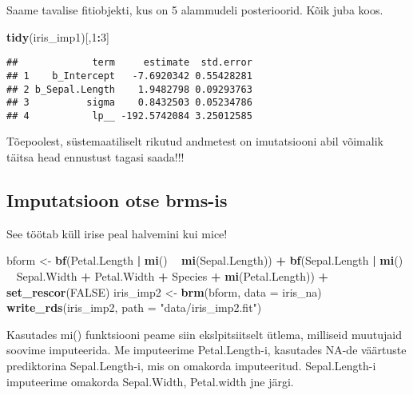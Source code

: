 \documentclass[]{article}
\newenvironment{Shaded}{\begin{snugshade}}{\end{snugshade}}
\newcommand{\KeywordTok}[1]{\textcolor[rgb]{0.13,0.29,0.53}{\textbf{#1}}}
\newcommand{\DataTypeTok}[1]{\textcolor[rgb]{0.13,0.29,0.53}{#1}}
\newcommand{\DecValTok}[1]{\textcolor[rgb]{0.00,0.00,0.81}{#1}}
\newcommand{\StringTok}[1]{\textcolor[rgb]{0.31,0.60,0.02}{#1}}
\newcommand{\OtherTok}[1]{\textcolor[rgb]{0.56,0.35,0.01}{#1}}
\newcommand{\OperatorTok}[1]{\textcolor[rgb]{0.81,0.36,0.00}{\textbf{#1}}}
\newcommand{\NormalTok}[1]{#1}
\begin{document}
Saame tavalise fitiobjekti, kus on 5 alammudeli posterioorid. Kõik juba
koos.

\begin{Shaded}
\begin{Highlighting}[]
\KeywordTok{tidy}\NormalTok{(iris_imp1)[,}\DecValTok{1}\OperatorTok{:}\DecValTok{3}\NormalTok{]}
\end{Highlighting}
\end{Shaded}

\begin{verbatim}
##             term     estimate  std.error
## 1    b_Intercept   -7.6920342 0.55428281
## 2 b_Sepal.Length    1.9482798 0.09293763
## 3          sigma    0.8432503 0.05234786
## 4           lp__ -192.5742084 3.25012585
\end{verbatim}

Tõepoolest, süstemaatiliselt rikutud andmetest on imutatsiooni abil
võimalik täitsa head ennustust tagasi saada!!!

\subsection{Imputatsioon otse brms-is}\label{imputatsioon-otse-brms-is}

See töötab küll irise peal halvemini kui mice!

\begin{Shaded}
\begin{Highlighting}[]
\NormalTok{bform <-}\StringTok{ }\KeywordTok{bf}\NormalTok{(Petal.Length }\OperatorTok{|}\StringTok{ }\KeywordTok{mi}\NormalTok{() }\OperatorTok{~}\StringTok{ }\KeywordTok{mi}\NormalTok{(Sepal.Length)) }\OperatorTok{+}\StringTok{ }
\StringTok{  }\KeywordTok{bf}\NormalTok{(Sepal.Length }\OperatorTok{|}\StringTok{ }\KeywordTok{mi}\NormalTok{() }\OperatorTok{~}\StringTok{ }\NormalTok{Sepal.Width }\OperatorTok{+}\StringTok{ }\NormalTok{Petal.Width }\OperatorTok{+}\StringTok{ }\NormalTok{Species }\OperatorTok{+}\StringTok{ }\KeywordTok{mi}\NormalTok{(Petal.Length)) }\OperatorTok{+}\StringTok{ }\KeywordTok{set_rescor}\NormalTok{(}\OtherTok{FALSE}\NormalTok{)}
\NormalTok{iris_imp2 <-}\StringTok{ }\KeywordTok{brm}\NormalTok{(bform, }\DataTypeTok{data =}\NormalTok{ iris_na)}
\KeywordTok{write_rds}\NormalTok{(iris_imp2, }\DataTypeTok{path =} \StringTok{"data/iris_imp2.fit"}\NormalTok{)}
\end{Highlighting}
\end{Shaded}

Kasutades mi() funktsiooni peame siin ekslpitsiitselt ütlema, milliseid
muutujaid soovime imputeerida. Me imputeerime Petal.Length-i, kasutades
NA-de väärtuste prediktorina Sepal.Length-i, mis on omakorda
imputeeritud. Sepal.Length-i imputeerime omakorda Sepal.Width,
Petal.width jne järgi.
\end{document}

